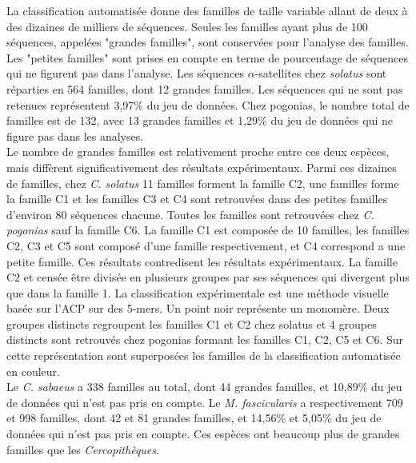 \documentclass[12pt,a4paper]{article}
\begin{document}
			La classification automatisée donne des familles de taille variable allant de deux  à des dizaines de milliers de séquences. Seules les familles ayant plus de 100 séquences, appelées "grandes familles", sont conservées pour l'analyse des familles. Les "petites familles" sont prises en compte en terme de pourcentage de séquences qui ne figurent pas dans l'analyse. Les séquences $\alpha$-satellites chez \textit{solatus} sont réparties en 564 familles, dont 12 grandes familles. Les séquences qui ne sont pas retenues représentent 3,97\% du jeu de données. Chez pogonias, le nombre total de familles est de 132, avec 13 grandes familles et 1,29\% du jeu de données qui  ne figure pas dans les analyses.\\
			 Le nombre de grandes familles est relativement proche entre ces deux espèces, mais diffèrent significativement des résultats expérimentaux. Parmi ces dizaines de familles, chez \textit{C. solatus} 11 familles forment la famille C2, une familles forme la famille C1 et les familles C3 et C4 sont retrouvées dans des petites familles d'environ 80 séquences chacune. Toutes les familles sont retrouvées chez \textit{C. pogonias} sauf la famille C6. La famille C1 est composée de 10 familles, les familles C2, C3 et C5 sont composé d'une famille respectivement, et C4 correspond a une petite famille. Ces résultats contredisent les résultats expérimentaux. La famille C2 et censée être divisée en plusieurs groupes par ses séquences qui divergent plus que dans la famille 1.  
			 La classification expérimentale est une méthode visuelle basée sur l'ACP sur des 5-mers. Un point noir représente un monomère. Deux groupes distincts regroupent les familles C1 et C2 chez solatus et 4 groupes distincts sont retrouvés chez pogonias formant les familles C1, C2, C5 et C6. Sur cette représentation sont superposées les familles de la classification automatisée en couleur. \\
			 Le \textit{C. sabaeus} a 338 familles au total, dont 44 grandes familles, et 10,89\% du jeu de données qui n'est pas pris en compte. Le \textit{M. fascicularis} a respectivement 709 et 998 familles, dont 42 et 81 grandes familles, et 14,56\% et 5,05\% du jeu de données qui n'est pas pris en compte. Ces espèces ont beaucoup plus de grandes familles que les \textit{Cercopithèques}. 
			 
\end{document}
